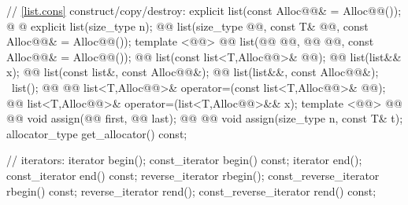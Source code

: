 \documentclass[american,twoside]{book}
\begin{document}
\begin{codeblock}
{{    // \ref{list.cons} construct/copy/destroy:
    explicit list(const Alloc@@& = Alloc@@());
    @ @ explicit list(size_type n);
    @@ 
      list(size_type @@, const T& @@, const Alloc@@& = Alloc@@());
    template <@@>
      @@
      list(@@ @@, @@ @@, const Alloc@@& = Alloc@@());
    @@ list(const list<T,Alloc@@>& @@);
    @@ list(list&& x);
    @@ list(const list&, const Alloc@@&);
    @@ list(list&&, const Alloc@@&);
   ~list();
    @@ @@
      list<T,Alloc@@>& operator=(const list<T,Alloc@@>& @@);
    @@
      list<T,Alloc@@>& operator=(list<T,Alloc@@>&& x);
    template <@@>
      @@
            @@
      void assign(@@ first, @@ last);
    @@ @@
      void assign(size_type n, const T& t);
    allocator_type get_allocator() const;

    // iterators:
    iterator               begin();
    const_iterator         begin() const;
    iterator               end();
    const_iterator         end() const;
    reverse_iterator       rbegin();
    const_reverse_iterator rbegin() const;
    reverse_iterator       rend();
    const_reverse_iterator rend() const;

}}
\end{codeblock}
\end{document}

